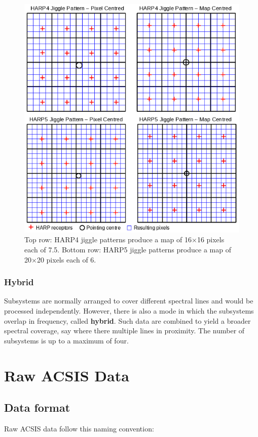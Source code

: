 \documentclass[11pt,oneside,chapters]{starlink}
\newcommand{\uarcs}{\hspace{-0.27em}\arcsec\hspace{-0.07em}}
\newcommand{\uarcs}{$''$}
\begin{document}
\begin{figure}[b!]
\begin{center}
\includegraphics[width=0.8\linewidth]{sc20_jiggles}
\caption[HARP4 and HARP5 jiggle patterns]{\label{fig:jiggle}
  Top row: HARP4 jiggle patterns produce a map of 16$\times$16 pixels
  each of 7.\uarcs5. Bottom row: HARP5 jiggle patterns produce a map of
  20$\times$20 pixels each of 6\arcsec. }
\end{center}
\end{figure}

\subsection{Hybrid}
\label{sec:hybrid}

Subsystems are normally arranged to cover different spectral lines and
would be processed independently.  However, there is also a mode in
which the subsystems overlap in frequency, called \textbf{hybrid}.
Such data are combined to yield a broader spectral coverage, say where
there multiple lines in proximity.  The number of subsystems is
up to a maximum of four.

\clearpage
\chapter{Raw ACSIS Data}
\label{sec:raw}

\section{Data format}
Raw ACSIS data follow this naming convention:
\end{document}
